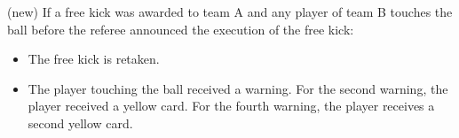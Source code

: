 {\bigskip

(new) If a free kick was awarded to team A and any player of team B touches the ball before the referee announced the execution of the free kick:

\begin{itemize}
\item The free kick is retaken.
\item The player touching the ball received a warning. For the second warning, the player received a yellow card. For the fourth warning, the player receives a second yellow card.
\end{itemize}

}